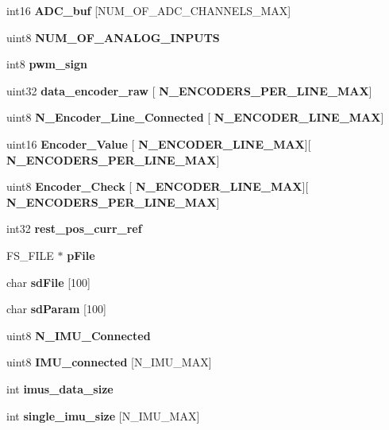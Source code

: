 \begin{DoxyCompactItemize}
int16 {\bfseries A\+D\+C\+\_\+buf} [N\+U\+M\+\_\+\+O\+F\+\_\+\+A\+D\+C\+\_\+\+C\+H\+A\+N\+N\+E\+L\+S\+\_\+\+M\+AX]
\item 
uint8 \textbf{ N\+U\+M\+\_\+\+O\+F\+\_\+\+A\+N\+A\+L\+O\+G\+\_\+\+I\+N\+P\+U\+TS}
\item 
int8 \textbf{ pwm\+\_\+sign}
\item 
\mbox{\label{globals_8h_a5190337b2d433e192edc68cf3d603ede}} 
uint32 {\bfseries data\+\_\+encoder\+\_\+raw} [\textbf{ N\+\_\+\+E\+N\+C\+O\+D\+E\+R\+S\+\_\+\+P\+E\+R\+\_\+\+L\+I\+N\+E\+\_\+\+M\+AX}]
\item 
\mbox{\label{globals_8h_ae62a59fe712aba1b45a5358ece0b3d35}} 
uint8 {\bfseries N\+\_\+\+Encoder\+\_\+\+Line\+\_\+\+Connected} [\textbf{ N\+\_\+\+E\+N\+C\+O\+D\+E\+R\+\_\+\+L\+I\+N\+E\+\_\+\+M\+AX}]
\item 
\mbox{\label{globals_8h_a7bf300fb19b8dd8db6783ef124605540}} 
uint16 {\bfseries Encoder\+\_\+\+Value} [\textbf{ N\+\_\+\+E\+N\+C\+O\+D\+E\+R\+\_\+\+L\+I\+N\+E\+\_\+\+M\+AX}][\textbf{ N\+\_\+\+E\+N\+C\+O\+D\+E\+R\+S\+\_\+\+P\+E\+R\+\_\+\+L\+I\+N\+E\+\_\+\+M\+AX}]
\item 
\mbox{\label{globals_8h_a269cff8427d6a8902a38dc258d649f06}} 
uint8 {\bfseries Encoder\+\_\+\+Check} [\textbf{ N\+\_\+\+E\+N\+C\+O\+D\+E\+R\+\_\+\+L\+I\+N\+E\+\_\+\+M\+AX}][\textbf{ N\+\_\+\+E\+N\+C\+O\+D\+E\+R\+S\+\_\+\+P\+E\+R\+\_\+\+L\+I\+N\+E\+\_\+\+M\+AX}]
\item 
int32 \textbf{ rest\+\_\+pos\+\_\+curr\+\_\+ref}
\item 
\mbox{\label{globals_8h_a28568209e5c79332f574608aafcd14ec}} 
F\+S\+\_\+\+F\+I\+LE $\ast$ {\bfseries p\+File}
\item 
\mbox{\label{globals_8h_a93ea3c816e507e10c5a48cb79d624863}} 
char {\bfseries sd\+File} [100]
\item 
\mbox{\label{globals_8h_ad49779e5c549cf4cb332a929eacc6b71}} 
char {\bfseries sd\+Param} [100]
\item 
\mbox{\label{globals_8h_a47118db87acd24ae6dac18b036f360ec}} 
uint8 {\bfseries N\+\_\+\+I\+M\+U\+\_\+\+Connected}
\item 
\mbox{\label{globals_8h_a99668f3210aba0be3baec19486621bce}} 
uint8 {\bfseries I\+M\+U\+\_\+connected} [N\+\_\+\+I\+M\+U\+\_\+\+M\+AX]
\item 
\mbox{\label{globals_8h_a86272fcfcab512d38a11824196df4bbc}} 
int {\bfseries imus\+\_\+data\+\_\+size}
\item 
\mbox{\label{globals_8h_aca96c483c3e269e3805aa861ced0aef5}} 
int {\bfseries single\+\_\+imu\+\_\+size} [N\+\_\+\+I\+M\+U\+\_\+\+M\+AX]

\end{DoxyCompactItemize}
